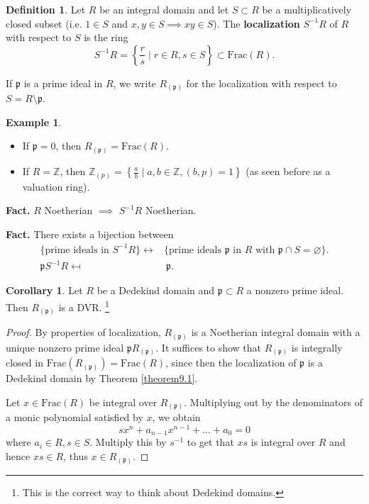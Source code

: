 \documentclass{article}
\theoremstyle{definition}
\newtheorem{cor}[theorem]{Corollary}
\newtheorem{example}{Example}[section]
\newtheorem{defn}{Definition}[section]
\begin{document}
\begin{defn}
    Let $R$ be an integral domain and let $S \subset R$ be a multiplicatively closed subset (i.e. $1 \in S$ and $x,y \in S \implies xy \in S$). The \textbf{localization} $S^{-1}R$ of $R$ with respect to $S$ is the ring \[
S^{-1}R = \left\{\frac{r}{s} \mid r \in R, s \in S\right\} \subset \text{Frac}(R).
\]
\end{defn}
If $\mathfrak{p}$ is a prime ideal in $R$, we write $R_{(\mathfrak{p})}$ for the localization with respect to $S = R \setminus \mathfrak{p}$.
\begin{example}
    \begin{itemize}
        \item If $\mathfrak{p} = 0$, then $R_{(\mathfrak{p})} = \text{Frac}(R)$.
        \item If $R = \mathbb{Z}$, then $\mathbb{Z}_{(p)} = \left\{\frac{a}{b} \mid a, b \in \mathbb{Z}, (b,p)=1\right\}$ (as seen before as a valuation ring).
    \end{itemize}
\end{example}
\textbf{Fact.} $R$ Noetherian $\implies $ $S^{-1}R$ Noetherian.
\vspace{1mm}
 
\textbf{Fact.} There exists a bijection between
\begin{align*}
    \{\text{prime ideals in }S^{-1}R\} \leftrightarrow& \{\text{prime ideals } \mathfrak{p} \text{ in }R\text{ with }\mathfrak{p} \cap S = \varnothing\}.\\
    \mathfrak{p}S^{-1}R \mapsfrom & ~\mathfrak{p}.
\end{align*}
\begin{cor}\label{cor9.4}
    Let $R$ be a Dedekind domain and $\mathfrak{p} \subset R$ a nonzero prime ideal. Then $R_{(\mathfrak{p})}$ is a DVR. \footnote{This is the correct way to think about Dedekind domains.}
\end{cor}
\begin{proof}
    By properties of localization, $R_{(\mathfrak{p})}$ is a Noetherian integral domain with a unique nonzero prime ideal $\mathfrak{p}R_{(\mathfrak{p})}$. It suffices to show that $R_{(\mathfrak{p})}$ is integrally closed in $\text{Frac}(R_{(\mathfrak{p})}) = \text{Frac}(R)$, since then the localization of $\mathfrak{p}$ is a Dedekind domain by Theorem \ref{theorem9.1}. \vspace{1mm}
     
    Let $x \in \text{Frac}(R)$ be integral over $R_{(\mathfrak{p})}$. Multiplying out by the denominators of a monic polynomial satisfied by $x$, we obtain \[
    sx^n + a_{n-1}x^{n-1} + \ldots + a_0  = 0
    \]
    where $a_i \in R, s \in S$. Multiply this by $s^{-1}$ to get that $xs$ is integral over $R$ and hence $xs \in R$, thus $x \in R_{(\mathfrak{p})}$.
\end{proof}
\end{document}
